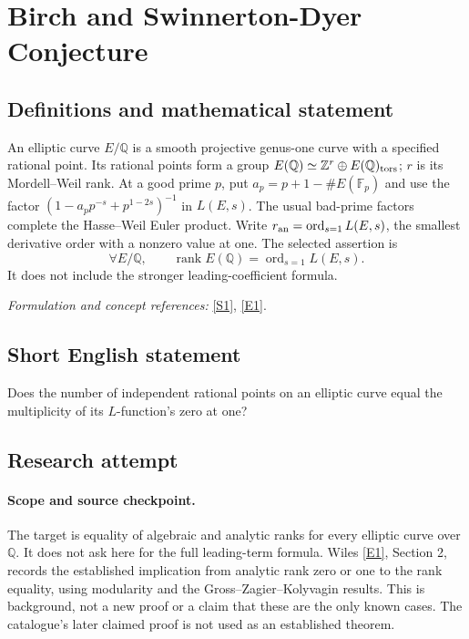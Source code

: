 \documentclass[11pt]{article}
\begin{document}
\section*{\texorpdfstring{Birch and Swinnerton-Dyer Conjecture}{Birch and Swinnerton-Dyer Conjecture}}\label{statement}
\subsection{Definitions and mathematical statement}
An elliptic curve $E/{\mathbb{Q}}$ is a smooth projective genus-one curve with a specified rational point. Its rational points form a group $E({\mathbb{Q}})\simeq{\mathbb{Z}}^r\oplus E({\mathbb{Q}})_{\rm tors}$; $r$ is its Mordell--Weil rank. At a good prime $p$, put $a_p=p+1-\#E({\mathbb{F}}_p)$ and use the factor $(1-a_pp^{-s}+p^{1-2s})^{-1}$ in $L(E,s)$. The usual bad-prime factors complete the Hasse--Weil Euler product. Write $r_{\rm an}=\operatorname{ord}_{s=1}L(E,s)$, the smallest derivative order with a nonzero value at one. The selected assertion is
\[
 \forall E/{\mathbb{Q}},\qquad \operatorname{rank}E({\mathbb{Q}})=\operatorname{ord}_{s=1}L(E,s).
\]
It does not include the stronger leading-coefficient formula.
\par\smallskip\textit{Formulation and concept references:} \href{https://www.claymath.org/library/monographs/MPPc.pdf}{[S1]}, \href{https://www.claymath.org/wp-content/uploads/2022/05/birchswin.pdf}{[E1]}.

\subsection{Short English statement}
Does the number of independent rational points on an elliptic curve equal the multiplicity of its $L$-function's zero at one?
\subsection{Research attempt}

\paragraph{Scope and source checkpoint.}
The target is equality of algebraic and analytic ranks for every elliptic
curve over $\mathbb Q$. It does not ask here for the full leading-term
formula. Wiles \href{https://www.claymath.org/wp-content/uploads/2022/05/birchswin.pdf}{[E1]}, Section 2, records the established implication from
analytic rank zero or one to the rank equality, using modularity and the
Gross--Zagier--Kolyvagin results. This is background, not a new proof or a
claim that these are the only known cases. The catalogue's later claimed
proof is not used as an established theorem.
\end{document}
